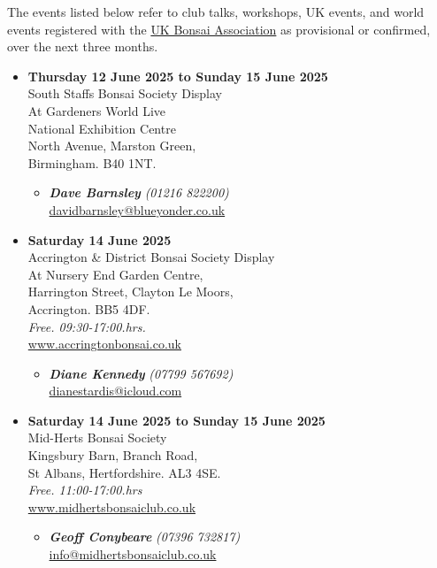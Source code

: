 \label{2025-06-events}

The events listed below refer to club talks, workshops, UK events, and world events registered with the \href{https://www.ukbonsaiassoc.org/events.html}{UK Bonsai Association} as provisional or confirmed, over the next three months.
\begin{itemize}
    \item \textbf{Thursday 12 June 2025 to Sunday 15 June 2025}
    \\
    South Staffs Bonsai Society Display \\
    At Gardeners World Live \\
    National Exhibition Centre \\
    North Avenue, Marston Green, \\
    Birmingham. B40 1NT.
    \begin{itemize}
        \item \textbf{\emph{Dave Barnsley}} \emph{(01216 822200)} \\
        \href{mailto:davidbarnsley@blueyonder.co.uk}{davidbarnsley@blueyonder.co.uk} 
    \end{itemize}

    \item \textbf{Saturday 14 June 2025}
    \\
    Accrington \& District Bonsai Society Display \\
    At Nursery End Garden Centre, \\
    Harrington Street, Clayton Le Moors, \\
    Accrington. BB5 4DF.
    \\
    \emph{Free. 09:30-17:00.hrs.}
    \\
    \href{https://www.accringtonbonsai.co.uk}{www.accringtonbonsai.co.uk}
    \begin{itemize}
        \item \textbf{\emph{Diane Kennedy}} \emph{(07799 567692)} \\
        \href{mailto:dianestardis@icloud.com}{dianestardis@icloud.com} 
    \end{itemize}

    \item \textbf{Saturday 14 June 2025 to Sunday 15 June 2025}
    \\
    Mid-Herts Bonsai Society \\
    Kingsbury Barn, Branch Road, \\
    St Albans, Hertfordshire. AL3 4SE.
    \\
    \emph{Free. 11:00-17:00.hrs}
    \\
    \href{https://www.midhertsbonsaiclub.co.uk}{www.midhertsbonsaiclub.co.uk}
    \begin{itemize}
        \item \textbf{\emph{Geoff Conybeare}} \emph{(07396 732817)} \\
        \href{mailto:info@midhertsbonsaiclub.co.uk}{info@midhertsbonsaiclub.co.uk} 
    \end{itemize}


\end{itemize}
